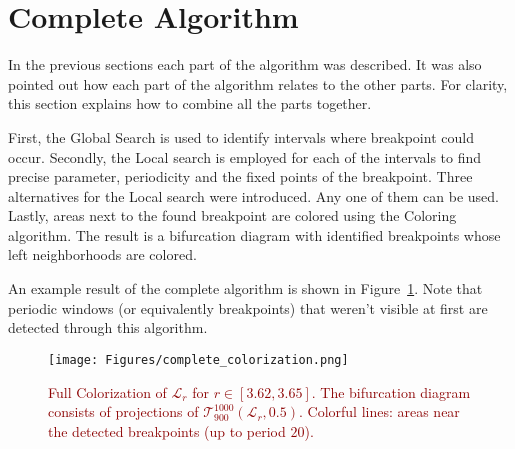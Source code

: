 \section{Complete Algorithm}
In the previous sections each part of the algorithm was described.
It was also pointed out how each part of the algorithm relates to the other parts.
For clarity, this section explains how to combine all the parts together.
\par
First, the Global Search is used to identify intervals where breakpoint could occur.
Secondly, the Local search is employed for each of the intervals to find precise parameter, periodicity and the fixed points of the breakpoint.
Three alternatives for the Local search were introduced.
Any one of them can be used.
Lastly, areas next to the found breakpoint are colored using the Coloring algorithm.
The result is a bifurcation diagram with identified breakpoints whose left neighborhoods are colored.
\par
An example result of the complete algorithm is shown in Figure~\ref{fig:complete_colorization}.
Note that periodic windows (or equivalently breakpoints) that weren't visible at first are detected through this algorithm.

\begin{figure}[!h]
    \centering
    \texttt{[image: Figures/complete\_colorization.png]}
    \caption{
        \textcolor{darkred}{
        Full Colorization of $\mathcal{L}_{r}$ for $r \in [ 3.62, 3.65 ]$.
        The bifurcation diagram consists of projections of $\mathcal{T}_{900}^{1000}(\mathcal{L}_{r}, 0.5)$.
        Colorful lines: areas near the detected breakpoints (up to period $20$).
        }
    }
    \label{fig:complete_colorization}
\end{figure}

\endinput